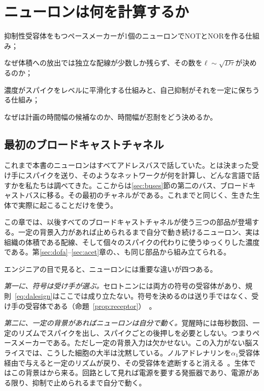 \chapter{ニューロンは何を計算するか}
\label{sec:serocomputer}
\begin{chaptergoals}
\item 抑制性受容体をもつペースメーカーが1個のニューロンでNOTとNORを作る仕組み；
\item なぜ体積への放出では独立な配線が少数しか残らず、その数を$\ell\sim\sqrt{D\tau}$が決めるのか；
\item 濃度がスパイクをレベルに平滑化する仕組みと、自己抑制がそれを一定に保ちうる仕組み；
\item なぜは計画の時間幅の候補なのか、時間幅が忍耐をどう決めるか。
\end{chaptergoals}

\section{最初のブロードキャストチャネル}

これまで本書のニューロンはすべてアドレスバスで話していた。とは決まった受け手にスパイクを送り、そのようなネットワークが何を計算し、どんな言語で話すかを私たちは調べてきた。ここからは\ref{sec:buses}節の第二のバス、ブロードキャストバスに移る。その最初のチャネルがである。これまでと同じく、生きた生体で実際に起こることだけを使う。

この章では、以後すべてのブロードキャストチャネルが使う三つの部品が登場する。一定の背景入力があれば止められるまで自分で動き続けるニューロン、実は組織の体積である配線、そして個々のスパイクの代わりに使うゆっくりした濃度である。第\ref{sec:dofa}--\ref{sec:acet}章の、、も同じ部品から組み立てられる。

エンジニアの目で見ると、ニューロンには重要な違いが四つある。

\emph{第一に、符号は受け手が選ぶ。}セロトニンには両方の符号の受容体があり、規則~\eqref{eq:dalesign}はここでは成り立たない。符号を決めるのは送り手ではなく、受け手の受容体である（命題~\ref{prop:receptor}）~\cite{BarnesSharp1999}。

\emph{第二に、一定の背景があればニューロンは自分で動く。}覚醒時には毎秒数回、一定のリズムでスパイクを出し、スパイクごとの後押しを必要としない。つまりペースメーカーである。ただし一定の背景入力は欠かせない。この入力がない脳スライスでは、こうした細胞の大半は沈黙している。ノルアドレナリンを$\alpha_1$受容体経由で与えると一定のリズムが戻り、その受容体を遮断すると消える~\cite{VandermaelenAghajanian1983}。生体ではこの背景はから来る。回路として見れば電源を要する発振器であり、電源がある限り、抑制で止められるまで自分で動く。

